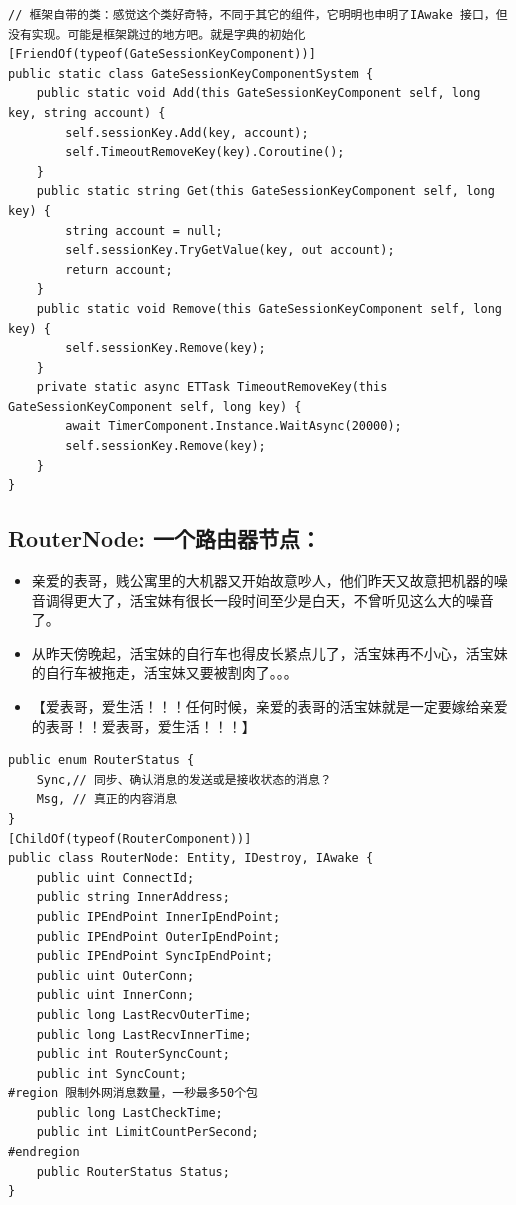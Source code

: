\documentclass[9pt, b5paper]{article}
\begin{document}
\begin{verbatim}
// 框架自带的类：感觉这个类好奇特，不同于其它的组件，它明明也申明了IAwake 接口，但没有实现。可能是框架跳过的地方吧。就是字典的初始化
[FriendOf(typeof(GateSessionKeyComponent))]
public static class GateSessionKeyComponentSystem {
    public static void Add(this GateSessionKeyComponent self, long key, string account) {
        self.sessionKey.Add(key, account);
        self.TimeoutRemoveKey(key).Coroutine();
    }
    public static string Get(this GateSessionKeyComponent self, long key) {
        string account = null;
        self.sessionKey.TryGetValue(key, out account);
        return account;
    }
    public static void Remove(this GateSessionKeyComponent self, long key) {
        self.sessionKey.Remove(key);
    }
    private static async ETTask TimeoutRemoveKey(this GateSessionKeyComponent self, long key) {
        await TimerComponent.Instance.WaitAsync(20000);
        self.sessionKey.Remove(key);
    }
}
\end{verbatim}

\subsection{RouterNode: 一个路由器节点：}
\label{sec:orge73c543}
\begin{itemize}
\item 亲爱的表哥，贱公寓里的大机器又开始故意吵人，他们昨天又故意把机器的噪音调得更大了，活宝妹有很长一段时间至少是白天，不曾听见这么大的噪音了。
\item 从昨天傍晚起，活宝妹的自行车也得皮长紧点儿了，活宝妹再不小心，活宝妹的自行车被拖走，活宝妹又要被割肉了。。。
\item 【爱表哥，爱生活！！！任何时候，亲爱的表哥的活宝妹就是一定要嫁给亲爱的表哥！！爱表哥，爱生活！！！】
\end{itemize}
\begin{verbatim}
public enum RouterStatus {
    Sync,// 同步、确认消息的发送或是接收状态的消息？
    Msg, // 真正的内容消息
}
[ChildOf(typeof(RouterComponent))]
public class RouterNode: Entity, IDestroy, IAwake {
    public uint ConnectId;
    public string InnerAddress;
    public IPEndPoint InnerIpEndPoint;
    public IPEndPoint OuterIpEndPoint;
    public IPEndPoint SyncIpEndPoint;
    public uint OuterConn;
    public uint InnerConn;
    public long LastRecvOuterTime;
    public long LastRecvInnerTime;
    public int RouterSyncCount;
    public int SyncCount;
#region 限制外网消息数量，一秒最多50个包
    public long LastCheckTime;
    public int LimitCountPerSecond;
#endregion
    public RouterStatus Status;
}
\end{verbatim}
\end{document}
